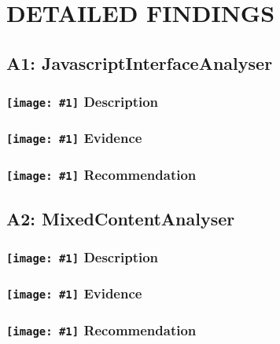 \documentclass[12p]{article}
\newcommand{\icon}[1]{\texttt{[image: \#1]}}
\begin{document}
\section{DETAILED FINDINGS}
\subsection{A1: JavascriptInterfaceAnalyser}
\subsubsection*{\protect\icon{/home/miki/Documents/GITHUB/AndroidPermissions/python/vulns/report_icons/basic_sheet.png} Description}

\subsubsection*{\protect\icon{/home/miki/Documents/GITHUB/AndroidPermissions/python/vulns/report_icons/basic_magnifier.png} Evidence}

\subsubsection*{\protect\icon{/home/miki/Documents/GITHUB/AndroidPermissions/python/vulns/report_icons/basic_todo.png} Recommendation}

\subsection{A2: MixedContentAnalyser}
\subsubsection*{\protect\icon{/home/miki/Documents/GITHUB/AndroidPermissions/python/vulns/report_icons/basic_sheet.png} Description}

\subsubsection*{\protect\icon{/home/miki/Documents/GITHUB/AndroidPermissions/python/vulns/report_icons/basic_magnifier.png} Evidence}

\subsubsection*{\protect\icon{/home/miki/Documents/GITHUB/AndroidPermissions/python/vulns/report_icons/basic_todo.png} Recommendation}
\end{document}
